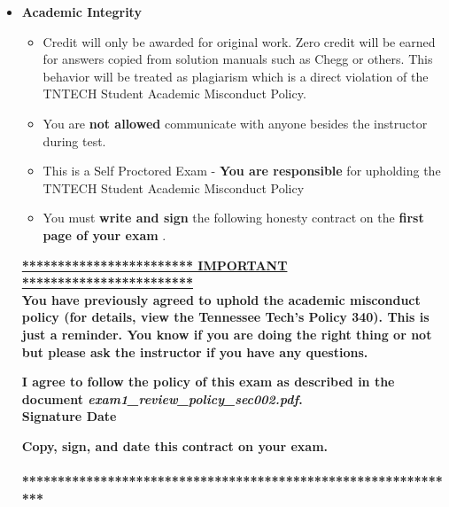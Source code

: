 \documentclass[11pt]{article}
\newcommand{\EXAMNUM}{1\hspace{0mm}}
\begin{document}
\begin{itemize}
\begin{itemize}
	\end{itemize}

\newpage
		\item  \textbf{ \Large Academic Integrity}
\begin{itemize}

		\item {\B Credit will only be awarded for original work. Zero credit will be earned for answers copied from solution manuals such as Chegg or others. This behavior will be treated as plagiarism which is a direct violation of the TNTECH Student Academic Misconduct Policy.}

		\item  You are {\bf not allowed} communicate with anyone besides the instructor during test. 
		\item This is a Self Proctored Exam - {\bf You are responsible} for upholding the TNTECH Student Academic Misconduct Policy
		\item  You must {\bf write and sign} the following honesty contract on the {\bf first page of your exam }. 
		
		

\end{itemize}


 {\R  \bf \underline{************************ IMPORTANT ************************}} \vspace{3mm}\\
			  {\R \bf You have previously agreed to uphold the academic misconduct policy (for details, view the
Tennessee Tech's Policy 340). This is just a reminder. You know if you are doing the right thing or not but please ask the instructor if you have any questions. }
\begin{framed}
	
	\vspace{3mm}	 \textbf{ I \underline{\hspace{50mm}} agree to follow the policy of this exam \vspc as described in the document {\it exam\EXAMNUM\_review\_policy\_sec002.pdf}.  }\vspace{3mm}\\
		 \textbf{\Large Signature \underline{\hspace{80mm}} Date\underline{\hspace{20mm} }}\\

\end{framed}
			{\R  \bf Copy, sign, and date this contract on your exam. }   \vspace{1mm}\\
			{\R  \bf \underline{\hspace{140mm}}} \\
			{\R  \bf ***************************************************************} 


\end{itemize}
\end{document}
